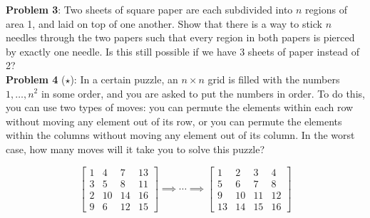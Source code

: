 \documentclass{amsart}
\begin{document}
	\noindent \textbf{Problem 3}: Two sheets of square paper are each subdivided into $n$ regions of area 1, and laid on top of one another. Show that there is a way to stick $n$ needles through the two papers such that every region in both papers is pierced by exactly one needle. Is this still possible if we have 3 sheets of paper instead of 2?\\
	
	\noindent \textbf{Problem 4} ($\star$): In a certain puzzle, an $n\times n$ grid is filled with the numbers $1,\dots,n^2$ in some order, and you are asked to put the numbers in order. To do this, you can use two types of moves: you can permute the elements within each row without moving any element out of its row, or you can permute the elements within the columns without moving any element out of its column. In the worst case, how many moves will it take you to solve this puzzle?
	
	$$
	\begin{bmatrix}
		1 & 4 & 7 & 13\\
		3 & 5 & 8 & 11 \\
		2 & 10 & 14 & 16\\
		9 & 6 & 12 & 15
	\end{bmatrix}
	\implies \cdots \implies 
	\begin{bmatrix}
		1 & 2 & 3 & 4\\
		5 & 6 & 7 & 8 \\
		9 & 10 & 11 & 12\\
		13 & 14 & 15 & 16
	\end{bmatrix}
	$$
\end{document}
